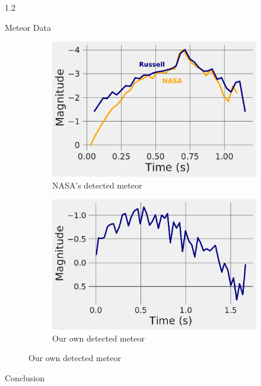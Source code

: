 \documentclass[final]{beamer}
\newlength{\twocolwid}
\begin{document}
\begin{frame}[t]
\begin{columns}[t]
\begin{column}{1.2\twocolwid}
\begin{alertblock}{Meteor Data}
\begin{figure}
\centering
\begin{subfigure}{.5\textwidth}
  \centering
  \includegraphics[width=\linewidth]{LightComparison0.pdf}
  \caption{NASA's detected meteor}
  \label{fig:sub1}
\end{subfigure}%
\begin{subfigure}{.5\textwidth}
  \centering
  \includegraphics[width=\linewidth]{D6Curve.pdf}
  \caption{Our own detected meteor}
  \label{fig:sub2}
\end{subfigure}
\label{fig:test}
\end{figure}

\end{alertblock}

\vspace{-1cm}


\begin{block}{Conclusion}


\end{block}
\end{column}
\end{columns}
\end{frame}
\end{document}
